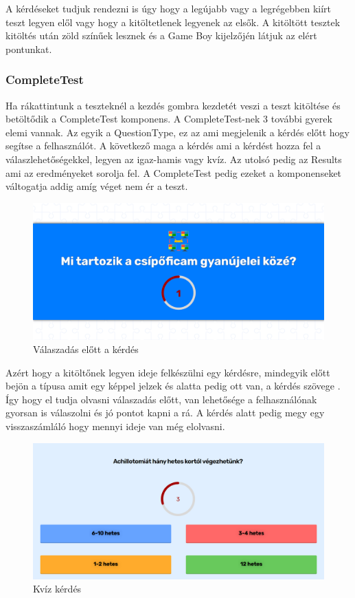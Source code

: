 A kérdéseket tudjuk rendezni is úgy hogy a legújabb vagy a legrégebben kiírt teszt legyen elől vagy hogy a kitöltetlenek legyenek az elsők.
A kitöltött tesztek kitöltés után zöld színűek lesznek és a Game Boy kijelzőjén látjuk az elért pontunkat.


\subsubsection{CompleteTest}

Ha rákattintunk a teszteknél a kezdés gombra kezdetét veszi a teszt kitöltése és betöltődik a CompleteTest komponens. A CompleteTest-nek 3 további gyerek elemi vannak. Az egyik a QuestionType, ez az ami megjelenik a kérdés előtt hogy segítse a felhasználót. A következő maga a kérdés ami a kérdést hozza fel a válaszlehetőségekkel, legyen az igaz-hamis vagy kvíz. Az utolsó pedig az Results ami az eredményeket sorolja fel. A CompleteTest pedig ezeket a komponenseket váltogatja addig amíg véget nem ér a teszt.

\begin{figure}[H]
    \centering
    \includegraphics[width=\linewidth]{images/question_type.png}
    \caption{Válaszadás előtt a kérdés}
    \label{fig:question_type}
\end{figure}

Azért hogy a kitöltőnek legyen ideje felkészülni egy kérdésre, mindegyik előtt bejön a típusa amit egy képpel jelzek és alatta pedig ott van, a kérdés szövege . Így hogy el tudja olvasni válaszadás előtt, van lehetősége a felhasználónak gyorsan is válaszolni és jó pontot kapni a rá. A kérdés alatt pedig megy egy visszaszámláló hogy mennyi ideje van még elolvasni.

\begin{figure}[H]
    \centering
    \includegraphics[width=\linewidth]{images/question1.png}
    \caption{Kvíz kérdés}
    \label{fig:question1}
\end{figure}

